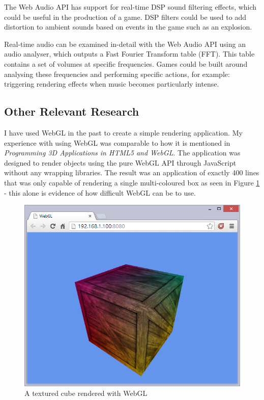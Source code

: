 \documentclass[a4paper, 12pt]{article}
\begin{document}
The Web Audio API has support for real-time DSP sound filtering effects, which could be useful in the production of a game. DSP filters could be used to add distortion to ambient sounds based on events in the game such as an explosion.

Real-time audio can be examined in-detail with the Web Audio API using an audio analyser, which outputs a Fast Fourier Transform table (FFT). This table contains a set of volumes at specific frequencies. Games could be built around analysing these frequencies and performing specific actions, for example: triggering rendering effects when music becomes particularly intense.

\subsection{Other Relevant Research}
I have used WebGL in the past to create a simple rendering application. My experience with using WebGL was comparable to how it is mentioned in \emph{Programming 3D Applications in HTML5 and WebGL}\cite{parisi2014programming}. The application was designed to render objects using the pure WebGL API through JavaScript without any wrapping libraries. The result was an application of exactly 400 lines that was only capable of rendering a single multi-coloured box as seen in Figure \ref{fig:webgl} - this alone is evidence of how difficult WebGL can be to use.

\begin{figure}[h]
	\centering
	\includegraphics[scale=0.5]{webgl}
	\caption{A textured cube rendered with WebGL}
	\label{fig:webgl}
\end{figure}
\end{document}

